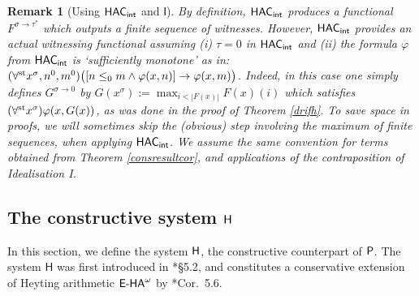 \documentclass[reqno]{amsart}
\newtheorem{rem}[thm]{Remark}
\def\H{\textup{\textsf{H}}}
\def\P{\textup{\textsf{P}}}
\def\st{\textup{st}}
\def\di{\rightarrow}
\def\HAC{\textup{\textsf{HAC}}}
\def\INT{\textup{\textsf{int}}}
\numberwithin{equation}{section}
\numberwithin{thm}{section}
\begin{document}
\begin{rem}[Using $\HAC_{\INT}$ and $\textsf{I}$]\label{simply}\rm
By definition, $\HAC_{\INT}$ produces a functional $F^{\sigma\di \tau^{*}}$ which outputs a \emph{finite sequence} of witnesses.  
However, $\HAC_{\INT}$ provides an actual \emph{witnessing functional} assuming (i) $\tau=0$ in $\HAC_{\INT}$ and (ii) the formula $\varphi$ from $\HAC_{\INT}$ is `sufficiently monotone' as in: 
$(\forall^{\st} x^{\sigma},n^{0},m^{0})\big([n\leq_{0}m \wedge\varphi(x,n)] \di \varphi(x,m)\big)$.    
Indeed, in this case one simply defines $G^{\sigma\di 0}$ by $G(x^{\sigma}):=\max_{i<|F(x)|}F(x)(i)$ which satisfies $(\forall^{\st}x^{\sigma})\varphi(x, G(x))$, as was done in the proof of Theorem \ref{drifh}.  
To save space in proofs, we will sometimes skip the (obvious) step involving the maximum of finite sequences, when applying $\HAC_{\INT}$.  %
We assume the same convention for terms obtained from Theorem \ref{consresultcor}, and applications of the contraposition of \emph{Idealisation} \textsf{I}.  
\end{rem}

\subsection{The constructive system $\H$}
In this section, we define the system $\H$, the constructive counterpart of $\P$. 
The system $\textsf{H}$ was first introduced in \cite{brie}*{\S5.2}, and constitutes a conservative extension of Heyting arithmetic $\textup{\textsf{E-HA}}^{\omega} $ by \cite{brie}*{Cor.\ 5.6}.

\medskip
\end{document}
